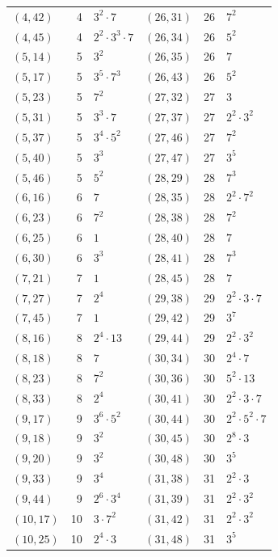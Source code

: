 \documentclass[11pt]{article}
\begin{document}
\begin{longtable}{@{}lrl@{\qquad}lrl@{}}
$(4,42)$ & 4 & $3^{2}\cdot 7$ & $(26,31)$ & 26 & $7^{2}$\\
$(4,45)$ & 4 & $2^{2}\cdot 3^{3}\cdot 7$ & $(26,34)$ & 26 & $5^{2}$\\
$(5,14)$ & 5 & $3^{2}$ & $(26,35)$ & 26 & $7$\\
$(5,17)$ & 5 & $3^{5}\cdot 7^{3}$ & $(26,43)$ & 26 & $5^{2}$\\
$(5,23)$ & 5 & $7^{2}$ & $(27,32)$ & 27 & $3$\\
$(5,31)$ & 5 & $3^{3}\cdot 7$ & $(27,37)$ & 27 & $2^{2}\cdot 3^{2}$\\
$(5,37)$ & 5 & $3^{4}\cdot 5^{2}$ & $(27,46)$ & 27 & $7^{2}$\\
$(5,40)$ & 5 & $3^{3}$ & $(27,47)$ & 27 & $3^{5}$\\
$(5,46)$ & 5 & $5^{2}$ & $(28,29)$ & 28 & $7^{3}$\\
$(6,16)$ & 6 & $7$ & $(28,35)$ & 28 & $2^{2}\cdot 7^{2}$\\
$(6,23)$ & 6 & $7^{2}$ & $(28,38)$ & 28 & $7^{2}$\\
$(6,25)$ & 6 & $1$ & $(28,40)$ & 28 & $7$\\
$(6,30)$ & 6 & $3^{3}$ & $(28,41)$ & 28 & $7^{3}$\\
$(7,21)$ & 7 & $1$ & $(28,45)$ & 28 & $7$\\
$(7,27)$ & 7 & $2^{4}$ & $(29,38)$ & 29 & $2^{2}\cdot 3\cdot 7$\\
$(7,45)$ & 7 & $1$ & $(29,42)$ & 29 & $3^{7}$\\
$(8,16)$ & 8 & $2^{4}\cdot 13$ & $(29,44)$ & 29 & $2^{2}\cdot 3^{2}$\\
$(8,18)$ & 8 & $7$ & $(30,34)$ & 30 & $2^{4}\cdot 7$\\
$(8,23)$ & 8 & $7^{2}$ & $(30,36)$ & 30 & $5^{2}\cdot 13$\\
$(8,33)$ & 8 & $2^{4}$ & $(30,41)$ & 30 & $2^{2}\cdot 3\cdot 7$\\
$(9,17)$ & 9 & $3^{6}\cdot 5^{2}$ & $(30,44)$ & 30 & $2^{2}\cdot 5^{2}\cdot 7$\\
$(9,18)$ & 9 & $3^{2}$ & $(30,45)$ & 30 & $2^{8}\cdot 3$\\
$(9,20)$ & 9 & $3^{2}$ & $(30,48)$ & 30 & $3^{5}$\\
$(9,33)$ & 9 & $3^{4}$ & $(31,38)$ & 31 & $2^{2}\cdot 3$\\
$(9,44)$ & 9 & $2^{6}\cdot 3^{4}$ & $(31,39)$ & 31 & $2^{2}\cdot 3^{2}$\\
$(10,17)$ & 10 & $3\cdot 7^{2}$ & $(31,42)$ & 31 & $2^{2}\cdot 3^{2}$\\
$(10,25)$ & 10 & $2^{4}\cdot 3$ & $(31,48)$ & 31 & $3^{5}$\\

\end{longtable}
\end{document}
